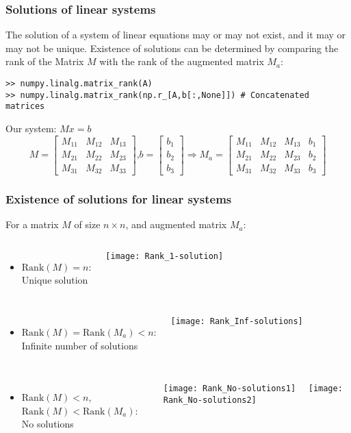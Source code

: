 \begin{frame}[fragile]
  \frametitle{Solutions of linear systems}
  The solution of a system of linear equations may or may not exist, and it may or may not be unique. Existence of solutions can be determined by comparing the rank of the Matrix $M$ with the rank of the augmented matrix $M_a$:
  \begin{lstlisting}
>> numpy.linalg.matrix_rank(A)
>> numpy.linalg.matrix_rank(np.r_[A,b[:,None]]) # Concatenated matrices
  \end{lstlisting}
  Our system: $Mx = b$\\
  \[ 
    M = \begin{bmatrix}
    M_{11} & M_{12} & M_{13}\\ 
    M_{21} & M_{22} & M_{23}\\ 
    M_{31} & M_{32} & M_{33}
    \end{bmatrix} \text{,} b=\begin{bmatrix}b_1\\b_2\\b_3  \end{bmatrix} \Rightarrow 
    M_a =     \begin{bmatrix}
    M_{11} & M_{12} & M_{13} & b_1\\ 
    M_{21} & M_{22} & M_{23} & b_2\\ 
    M_{31} & M_{32} & M_{33} & b_3
    \end{bmatrix}
  \]
\end{frame}

\begin{frame}
 \frametitle{Existence of solutions for linear systems}
  For a matrix $M$ of size $n \times n$, and augmented matrix $M_a$:
 \begin{columns}
 \begin{itemize}
   \item $\text{Rank}(M) = n$:\\ Unique solution
 \end{itemize}
   \texttt{[image: Rank\_1-solution]}
 \end{columns}
 \pause
  \begin{columns}
 \begin{itemize}
   \item $\text{Rank}(M) = \text{Rank}(M_a) < n$:\\ Infinite number of solutions
 \end{itemize}
   \texttt{[image: Rank\_Inf-solutions]}
 \end{columns}
 \pause
  \begin{columns}
 \begin{itemize}
   \item $\text{Rank}(M) < n$, $\text{Rank}(M) < \text{Rank}(M_a)$:\\ No solutions
 \end{itemize}
   \texttt{[image: Rank\_No-solutions1]} \ \ 
   \texttt{[image: Rank\_No-solutions2]}
 \end{columns}
\end{frame}
 
